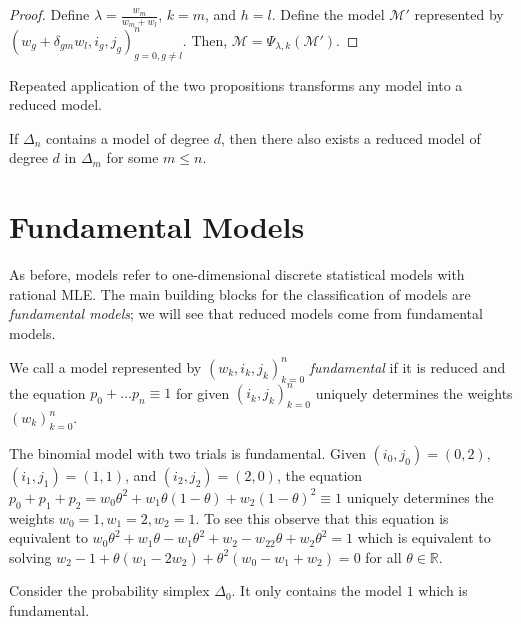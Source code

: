 \begin{proof}
    Define \( \lambda = \frac{w_m}{w_m + w_l} \), \( k = m \), and \( h = l \). Define the model \( \mathcal{M}' \) represented by \(  \left( w_g + \delta_{gm}w_l, i_g, j_g  \right)^n_{g=0, g \neq l} \).
    Then, \( \mathcal{M} = \Psi_{\lambda,k}(\mathcal{M}') \).
\end{proof}

Repeated application of the two propositions transforms any model into a reduced model.

\begin{corollary}\label{cor:reduced-models}
    If \( \Delta_n \) contains a model of degree \( d \), then there also exists a reduced model of degree \( d \) in \( \Delta_m \) for some \( m \leq n \).
\end{corollary}


\section{Fundamental Models}

As before, models refer to one-dimensional discrete statistical models with rational MLE. The main building blocks for the classification of models are \emph{fundamental models}; we will see that reduced models come from fundamental models.

\begin{definition}\label{def:fundamental-model}
    We call a model represented by \( (w_k, i_k, j_k)_{k=0}^n \) \emph{fundamental} if it is reduced and the equation \( p_0 + \dots p_n \equiv 1 \) for given \( (i_k, j_k)_{k=0}^n \) uniquely determines the weights \( (w_k)_{k=0}^n \).
\end{definition}

\begin{example}
    The binomial model with two trials is fundamental. Given \( (i_0, j_0) = (0,2) \), \( (i_1, j_1) = (1,1) \), and \( (i_2, j_2) = (2,0) \), the equation \( p_0 + p_1 + p_2 = w_0\theta^2 + w_1\theta(1-\theta) + w_2(1-\theta)^2 \equiv 1 \) uniquely determines the weights \( w_0 = 1, w_1 = 2, w_2 = 1 \). To see this observe that this equation is equivalent to \( w_0\theta^2 + w_1\theta - w_1 \theta^2 + w_2 -w_22\theta + w_2\theta^2 = 1\) which is equivalent to solving \( w_2 - 1 + \theta(w_1 - 2w_2) + \theta^2(w_0 - w_1 + w_2) = 0 \) for all \( \theta \in \mathbb{R} \).
\end{example}

\begin{example}\label{ex:prob-simplex-0}
    Consider the probability simplex \( \Delta_0 \). It only contains the model \( 1 \) which is fundamental.
\end{example}

